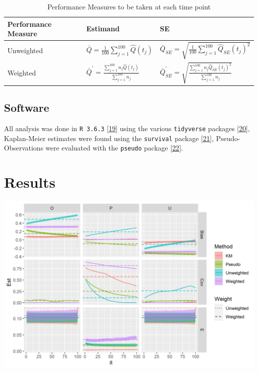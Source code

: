 \documentclass[12pt,PhD,twoside,openright]{muthesis}
\begin{document}
\begin{table}

\caption{\label{tab:PM-DGM}{\small Performance Measures to be taken at each time point}}
\centering
\fontsize{7}{9}\selectfont
\begin{tabular}[t]{lll}
\toprule
Performance Measure & Estimand & SE\\
\midrule
\rowcolor{gray!6}  Unweighted & $\bar{Q}=\frac{1}{100}\sum_{j=1}^{100}\hat{Q}(t_j)$ & $\bar{Q}_{SE}=\sqrt{\frac{1}{100}\sum_{j=1}^{100} \hat{Q}_{SE}(t_j)^2 }$\\
Weighted & $\bar{Q}^{\prime}=\frac{\sum_{j=1}^{100}n_j\hat{Q}(t_j) }{\sum_{j=1}^{100}n_j}$ & $\bar{Q}^{\prime}_{SE} = \sqrt{\frac{\sum_{j=1}^{100} n_j \hat{Q}_{SE}(t_j)^2 }{\sum_{j=1}^{100}n_j}}$\\
\bottomrule
\end{tabular}
\end{table}
\hypertarget{software}{%
\subsection{Software}\label{software}}

All analysis was done in \texttt{R\ 3.6.3} {[}\protect\hyperlink{ref-r_core_team_r_nodate}{19}{]} using the various \texttt{tidyverse} packages {[}\protect\hyperlink{ref-wickham_tidy_2017}{20}{]}, Kaplan-Meier estimates were found using the \texttt{survival} package {[}\protect\hyperlink{ref-therneau_package_2020}{21}{]}, Pseudo-Observations were evaluated with the \texttt{pseudo} package {[}\protect\hyperlink{ref-perme_pseudo_2017}{22}{]}.

\hypertarget{results-3}{%
\section{Results}\label{results-3}}

\includegraphics[width=29.51in]{figure/IPCW_Logistic/Main_Plot}
\end{document}
